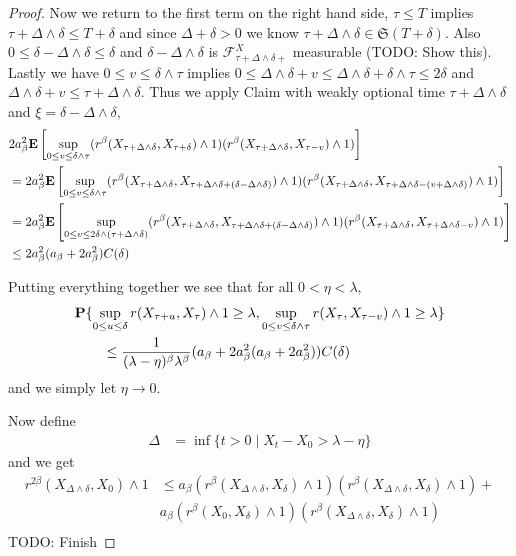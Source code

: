 \begin{proof}
Now we return to the first term on the right hand side, $\tau \leq T$ implies $\tau + \Delta \wedge \delta \leq T + \delta$ and since $\Delta + \delta > 0$ we know $\tau + \Delta \wedge \delta \in \mathfrak{S}(T + \delta)$.  Also $0 \leq \delta - \Delta \wedge \delta \leq \delta$ and $\delta - \Delta \wedge \delta$ is $\mathcal{F}^X_{\tau + \Delta \wedge \delta +}$ measurable (TODO: Show this).  Lastly we have $0 \leq v \leq \delta \wedge \tau$ implies $0 \leq \Delta \wedge \delta + v \leq \Delta \wedge \delta + \delta \wedge \tau \leq 2 \delta$ and $\Delta \wedge \delta + v \leq \tau + \Delta \wedge \delta$.  Thus we apply Claim with weakly optional time $\tau + \Delta \wedge \delta$ and $\xi = \delta - \Delta \wedge \delta$,
\begin{align*}
&2 a^2_\beta \textbf{E}\left[\sup_{0 \leq v \leq \delta \wedge \tau} (r^\beta(X_{\tau + \Delta \wedge \delta}, X_{\tau + \delta}) \wedge 1)(r^\beta(X_{\tau+\Delta \wedge \delta}, X_{\tau - v}) \wedge 1) \right] \\
&=2 a^2_\beta \textbf{E}\left[\sup_{0 \leq v \leq \delta \wedge \tau} (r^\beta(X_{\tau + \Delta \wedge \delta}, X_{\tau + \Delta \wedge \delta+ (\delta - \Delta \wedge \delta)})\wedge 1)
(r^\beta(X_{\tau+\Delta \wedge \delta}, X_{\tau + \Delta \wedge \delta- (v + \Delta \wedge \delta)}) \wedge 1)\right] \\
&=2 a^2_\beta \textbf{E}\left[\sup_{0 \leq v \leq 2\delta \wedge (\tau + \Delta \wedge \delta)} (r^\beta(X_{\tau + \Delta \wedge \delta}, X_{\tau + \Delta \wedge \delta+ (\delta - \Delta \wedge \delta)})\wedge 1)
(r^\beta(X_{\tau+\Delta \wedge \delta}, X_{\tau + \Delta \wedge \delta- v}) \wedge 1)\right] \\
&\leq 2 a^2_\beta (a_\beta + 2a^2_\beta)C(\delta)
\end{align*}

Putting everything together we see that for all $0 < \eta < \lambda$,
\begin{align*}
&\textbf{P}\{\sup_{0 \leq u \leq \delta} r(X_{\tau + u}, X_\tau) \wedge 1 \geq \lambda, \sup_{0 \leq v \leq \delta \wedge \tau} r(X_{\tau}, X_{\tau-v}) \wedge 1 \geq \lambda\} \\
&\qquad \leq \frac{1}{(\lambda - \eta)^\beta \lambda^\beta} (a_\beta + 2 a^2_\beta (a_\beta + 2a^2_\beta))C(\delta)
\end{align*}
and we simply let $\eta \to 0$.

Now define 
\begin{align*}
\Delta &= \inf \lbrace t >0 \mid X_{t} - X_0 > \lambda - \eta \rbrace
\end{align*}
and we get
\begin{align*}
r^{2\beta}(X_{\Delta \wedge \delta}, X_0) \wedge 1
&\leq a_\beta (r^{\beta}(X_{\Delta \wedge \delta}, X_\delta) \wedge 1) (r^{\beta}(X_{\Delta \wedge \delta}, X_\delta) \wedge 1) + \\
&a_\beta (r^{\beta}(X_0, X_\delta)\wedge 1)( r^{\beta}(X_{\Delta \wedge \delta}, X_\delta) \wedge 1) \\
\end{align*}
TODO: Finish
\end{proof}

